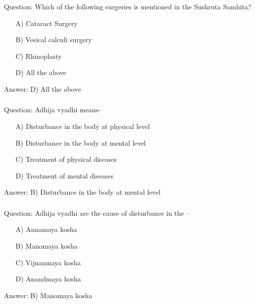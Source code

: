 \begin{frame}[fragile]\frametitle{}

Question: Which of the following surgeries is mentioned in the Sushruta Samhita?

\begin{itemize}
\item[A)] Cataract Surgery
\item[B)] Vesical calculi surgery
\item[C)] Rhinoplasty
\item[D)] All the above
\end{itemize}

Answer: D) All the above
\end{frame}


\begin{frame}[fragile]\frametitle{}

Question: Adhija vyadhi means-

\begin{itemize}
\item[A)] Disturbance in the body at physical level
\item[B)] Disturbance in the body at mental level
\item[C)] Treatment of physical diseases
\item[D)] Treatment of mental diseases
\end{itemize}

Answer: B) Disturbance in the body at mental level
\end{frame}

\begin{frame}[fragile]\frametitle{}

Question: Adhija vyadhi are the cause of disturbance in the –

\begin{itemize}
\item[A)] Annamaya kosha
\item[B)] Manomaya kosha
\item[C)] Vijnanmaya kosha
\item[D)] Anandmaya kosha
\end{itemize}

Answer: B) Manomaya kosha
\end{frame}

